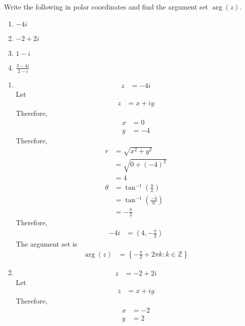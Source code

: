 \documentclass[fleqn, a4paper, 11pt, oneside]{amsart}
\theoremstyle{definition}
\theoremstyle{theorem}
\begin{document}
\setcounter{question}{4}
\begin{question}
	Write the following in polar coordinates and find the argument set $\arg(z)$.
	\begin{enumerate}
		\item $-4 i$
		\item $-2 + 2 i$
		\item $1 - i$
		\item $\frac{3 - 4 i}{2 - i}$
	\end{enumerate}
\end{question}

\begin{solution}
	\begin{enumerate}[leftmargin=*]
		\item
			\begin{align*}
				z &= -4 i
			\end{align*}
			Let
			\begin{align*}
				z &= x + i y
			\end{align*}
			Therefore,
			\begin{align*}
				x &= 0\\
				y &= -4
			\end{align*}
			Therefore,
			\begin{align*}
				r &= \sqrt{x^2 + y^2}\\
				&= \sqrt{0 + (-4)^2}\\
				&= 4\\
				\theta &= \tan^{-1}\left( \frac{y}{x} \right)\\
				&= \tan^{-1}\left( \frac{-4}{0} \right)\\
				&= -\frac{\pi}{2}
			\end{align*}
			Therefore,
			\begin{align*}
				-4 i &= \left( 4 , -\frac{\pi}{2} \right)
			\end{align*}
			The argument set is
			\begin{align*}
				\arg(z) &= \left\{ -\frac{\pi}{2} + 2 \pi k : k \in \mathbb{Z} \right\}
			\end{align*}
		\item
			\begin{align*}
				z &= -2 + 2 i
			\end{align*}
			Let
			\begin{align*}
				z &= x + i y
			\end{align*}
			Therefore,
			\begin{align*}
				x &= -2\\
				y &= 2

\end{align*}
\end{enumerate}
\end{solution}
\end{document}
